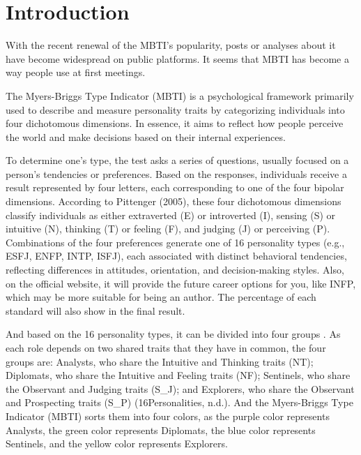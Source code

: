 \documentclass[12pt]{article}
\numberwithin{figure}{section}  %
\begin{document}
	\tableofcontents
	\newpage
	
	\setcounter{page}{1}
	
	
	
	\section{Introduction}
	With the recent renewal of the MBTI's popularity, posts or analyses about it
	have become widespread on public platforms. It seems that MBTI has become a
	way people use at first meetings.
	
	The Myers-Briggs Type Indicator (MBTI) is a psychological framework
	primarily used to describe and measure personality traits by categorizing
	individuals into four dichotomous dimensions. In essence, it aims to reflect
	how people perceive the world and make decisions based on their internal
	experiences\cite{yang2022research}.
	
	To determine one's type, the test asks a series of questions, usually focused on a person's tendencies or preferences. Based on the responses, individuals receive a result represented by four letters, each corresponding to one of the four bipolar dimensions. According to Pittenger (2005), these four dichotomous dimensions classify individuals as either extraverted (E) or introverted (I), sensing (S) or intuitive (N), thinking (T) or feeling (F), and judging (J) or perceiving (P). Combinations of the four preferences generate one of 16 personality types (e.g., ESFJ, ENFP, INTP, ISFJ), each associated with distinct behavioral tendencies, reflecting differences in attitudes, orientation, and decision-making styles. Also, on the official website, it will provide the future career options for you, like INFP, which may be more suitable for being an author. The percentage of each standard will also show in the final result.
	
	And based on the 16 personality types, it can be divided into four groups  . As each role depends on two shared traits that they have in common, the four groups are: Analysts, who share the Intuitive and Thinking traits (NT); Diplomats, who share the Intuitive and Feeling traits (NF); Sentinels, who share the Observant and Judging traits (S\_J); and Explorers, who share the Observant and Prospecting traits (S\_P) (16Personalities, n.d.). And the Myers-Briggs Type Indicator (MBTI) sorts them into four colors, as the purple color represents Analysts, the green color represents Diplomats, the blue color represents Sentinels, and the yellow color represents Explorers.
	
\end{document}
